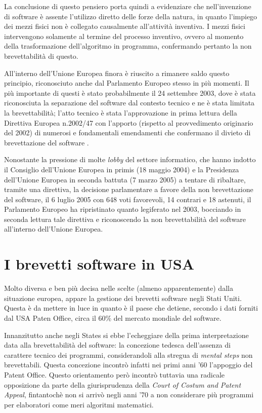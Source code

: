 La conclusione di questo pensiero porta quindi a evidenziare che nell'invenzione di software è assente l'utilizzo diretto delle forze della natura, in quanto l'impiego dei mezzi fisici non è collegato causalmente all'attività inventiva. I mezzi fisici intervengono solamente al termine del processo inventivo, ovvero al momento della trasformazione dell'algoritmo in programma, confermando pertanto la non brevettabilità di questo.

All'interno dell'Unione Europea finora è riuscito a rimanere saldo questo principio, riconosciuto anche dal Parlamento Europeo stesso in più momenti. Il più importante di questi è stato probabilmente il 24 settembre 2003, dove è stata riconosciuta la separazione del software dal contesto tecnico e ne è stata limitata la brevettabilità; l'atto tecnico è stata l'approvazione in prima lettura della Direttiva Europea n.2002/47 con l'apporto (rispetto al provvedimento originario del 2002) di numerosi e fondamentali emendamenti che confermano il divieto di brevettazione del software .

Nonostante la pressione di molte \textit{lobby} del settore informatico, che hanno indotto il Consiglio dell'Unione Europea in primis (18 maggio 2004) e la Presidenza dell'Unione Europea in seconda battuta (7 marzo 2005) a tentare di ribaltare, tramite una direttiva, la decisione parlamentare a favore della non brevettazione del software, il 6 luglio 2005 con 648 voti favorevoli, 14 contrari e 18 astenuti, il Parlamento Europeo ha ripristinato quanto legiferato nel 2003, bocciando in seconda lettura tale direttiva e riconoscendo la non brevettabilità del software all'interno dell'Unione Europea.

\section{I brevetti software in USA}

Molto diversa e ben più decisa nelle scelte (almeno apparentemente) dalla situazione europea, appare la gestione dei brevetti software negli Stati Uniti. Questa è da mettere in luce in quanto è il paese che detiene, secondo i dati forniti dal USA Paten Office, circa il 60\% del mercato mondiale del software.

Innanzitutto anche negli States si ebbe l'echeggiare della prima interpretazione data alla brevettabilità del software: la concezione tedesca dell'assenza di carattere tecnico dei programmi, considerandoli alla stregua di \textit{mental steps} non brevettabili. Questa concezione incontrò infatti nei primi anni '60 l'appoggio del Patent Office. Questo orientamento però incontrò tuttavia una radicale opposizione da parte della giurisprudenza della \textit{Court of Costum and Patent Appeal}, fintantochè non si arrivò negli anni '70 a non considerare più programmi per elaboratori come meri algoritmi matematici.

